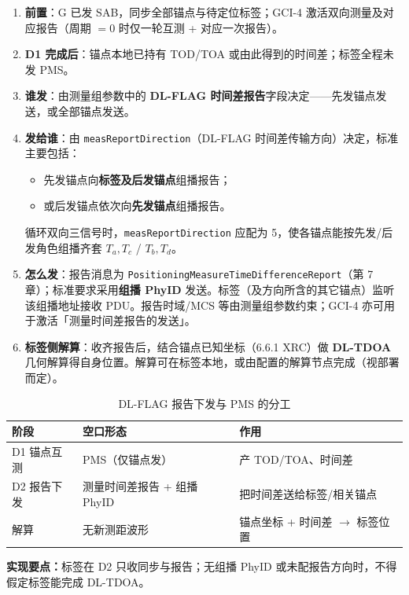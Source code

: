 \documentclass[11pt,a4paper]{ctexart}
\begin{document}
\begin{enumerate}
  \item \textbf{前置}：G 已发 SAB，同步全部锚点与待定位标签；GCI-4 激活双向测量及对应报告（周期 $=0$ 时仅一轮互测 + 对应一次报告）。
  \item \textbf{D1 完成后}：锚点本地已持有 TOD/TOA 或由此得到的时间差；标签全程未发 PMS。
  \item \textbf{谁发}：由测量组参数中的 \textbf{DL-FLAG 时间差报告}字段决定——先发锚点发送，或全部锚点发送。
  \item \textbf{发给谁}：由 \texttt{measReportDirection}（DL-FLAG 时间差传输方向）决定，标准主要包括：
  \begin{itemize}[nosep]
    \item 先发锚点向\textbf{标签及后发锚点}组播报告；
    \item 或后发锚点依次向\textbf{先发锚点}组播报告。
  \end{itemize}
  循环双向三信号时，\texttt{measReportDirection} 应配为 5，使各锚点能按先发/后发角色组播齐套 $T_a,T_c$ / $T_b,T_d$。
  \item \textbf{怎么发}：报告消息为 \texttt{PositioningMeasureTimeDifferenceReport}（第 7 章）；标准要求采用\textbf{组播 PhyID} 发送。标签（及方向所含的其它锚点）监听该组播地址接收 PDU。报告时域/MCS 等由测量组参数约束；GCI-4 亦可用于激活「测量时间差报告的发送」。
  \item \textbf{标签侧解算}：收齐报告后，结合锚点已知坐标（6.6.1 XRC）做 \textbf{DL-TDOA} 几何解算得自身位置。解算可在标签本地，或由配置的解算节点完成（视部署而定）。
\end{enumerate}

\begin{table}[h]
\centering
\small
\caption{DL-FLAG 报告下发与 PMS 的分工}
\begin{tabular}{L{2.8cm}L{5.5cm}L{5cm}}
\toprule
\textbf{阶段} & \textbf{空口形态} & \textbf{作用} \\
\midrule
D1 锚点互测 & PMS（仅锚点发） & 产 TOD/TOA、时间差 \\
D2 报告下发 & 测量时间差报告 + 组播 PhyID & 把时间差送给标签/相关锚点 \\
解算 & 无新测距波形 & 锚点坐标 + 时间差 $\rightarrow$ 标签位置 \\
\bottomrule
\end{tabular}
\end{table}

\noindent\textbf{实现要点：}标签在 D2 只收同步与报告；无组播 PhyID 或未配报告方向时，不得假定标签能完成 DL-TDOA。
\end{document}
